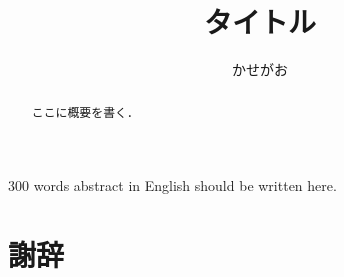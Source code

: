 \documentclass[system, master]{systemM}
\title{タイトル}
\author{かせがお}
\begin{document}
\maketitle%

\frontmatter%


\begin{eabstract}%
 300 words abstract in English should be written here. 
\end{eabstract}

\begin{abstract}%
 ここに概要を書く．
\end{abstract}


{\makeatletter
\let\ps@jpl@in\ps@empty
\makeatother
\pagestyle{empty}
\tableofcontents
\clearpage}

\mainmatter%


\backmatter%
\chapter{謝辞}%



\appendix%
\chapter{}
\end{document}
